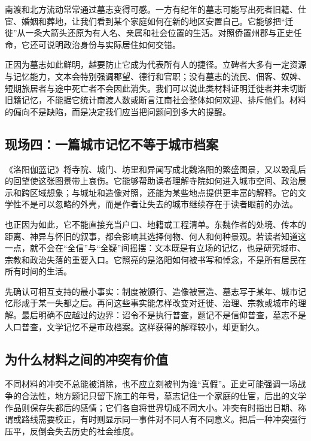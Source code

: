 南渡和北方流动常常通过墓志变得可感。一方有纪年的墓志可能写出死者旧籍、仕宦、婚姻和葬地，让我们看到某个家庭如何在新的地区安置自己。它能够把“迁徙”从一条大箭头还原为有人名、亲属和社会位置的生活。对照侨置州郡与正史任命，它还可说明政治身份与实际居住如何交错。

正因为墓志如此鲜明，越要防止它成为代表所有人的捷径。立碑者大多有一定资源与记忆能力，文本会特别强调郡望、德行和官职；没有墓志的流民、佃客、奴婢、短期旅居者与途中死亡者不会因此消失。我们可以说此类材料证明迁徙者并未切断旧籍记忆，不能据它统计南渡人数或断言江南社会整体如何欢迎、排斥他们。材料的偏向不是缺陷，而是决定我们应当把问题问到多大的提醒。

\subsection{现场四：一篇城市记忆不等于城市档案}

《洛阳伽蓝记》将寺院、城门、坊里和异闻写成北魏洛阳的繁盛图景，又以毁乱后的回望使这张图景带上哀伤。它能够帮助读者理解寺院如何进入城市空间、政治展示和跨区域想象；与城址和造像对照，还能为某些地点提供更丰富的解释。它的文学性不是可以忽略的外壳，而是作者让失去的城市继续存在于读者眼前的办法。

也正因为如此，它不能直接充当户口、地籍或工程清单。东魏作者的处境、传本的距离、神异与怀旧的叙事，都会影响其选择何物、何人和何种景观。若读者知道这一点，就不会在“全信”与“全疑”间摇摆：文本既是有立场的记忆，也是研究城市、宗教和政治失落的重要入口。它照亮的是洛阳如何被书写和悼念，不是所有居民在所有时间的生活。

\begin{causalchain}[从材料到解释的正确尺度]
先确认可相互支持的最小事实：制度被颁行、造像被营造、墓志写于某年、城市记忆形成于某一失都之后。再问这些事实能怎样改变对迁徙、治理、宗教或城市的理解。最后明确不应越过的边界：诏令不是执行普查，题记不是信仰普查，墓志不是人口普查，文学记忆不是市政档案。这样获得的解释较小，却更耐久。
\end{causalchain}

\subsection{为什么材料之间的冲突有价值}

不同材料的冲突不总能被消除，也不应立刻被判为谁“真假”。正史可能强调一场战争的合法性，地方题记只留下施工的年号，墓志记住一个家庭的仕宦，后出的文学作品则保存失都后的感情；它们各自将世界切成不同大小。冲突有时指出日期、称谓或路线需要校正，有时则显示同一事件对不同人有不同意义。把后一种冲突强行压平，反倒会失去历史的社会维度。

